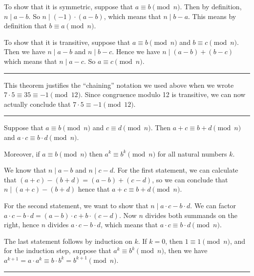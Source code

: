 \documentclass[letterpaper,10pt,english]{sphinxmanual}
\begin{document}
\sphinxAtStartPar
To show that it is symmetric, suppose that \(a \equiv b \pmod{n}\). Then by definition, \(n \mid a - b\). So \(n \mid (-1) \cdot (a - b)\), which means that \(n \mid b - a\). This means by definition that \(b \equiv a \pmod{n}\).

\sphinxAtStartPar
To show that it is transitive, suppose that \(a \equiv b \pmod{n}\) and \(b \equiv c \pmod{n}\). Then we have \(n \mid a - b\) and \(n \mid b - c\). Hence we have \(n \mid (a - b) + (b - c)\) which means that \(n \mid a - c\). So \(a \equiv c \pmod{n}\).


\bigskip\hrule\bigskip


\sphinxAtStartPar
This theorem justifies the “chaining” notation we used above when we wrote \(7 \cdot 5 \equiv 35 \equiv -1 \pmod{12}\). Since congruence modulo 12 is transitive, we can now actually conclude that \(7\cdot 5\equiv -1 \pmod{12}\).


\bigskip\hrule\bigskip


\sphinxAtStartPar
{} Suppose that \(a\equiv b \pmod{n}\) and \(c\equiv d\pmod{n}\). Then \(a+c\equiv b+d \pmod{n}\) and \(a\cdot c\equiv b\cdot d\pmod{n}\).

\sphinxAtStartPar
Moreover, if \(a\equiv b \pmod{n}\) then \(a^k\equiv b^k \pmod{n}\) for all natural numbers \(k\).

\sphinxAtStartPar
{} We know that \(n \mid a - b\) and \(n \mid c - d\). For the first statement, we can calculate that \((a + c) - (b + d) = (a - b) + (c - d)\), so we can conclude that \(n \mid (a + c) - (b + d)\) hence that \(a+c\equiv b+d\pmod{n}\).

\sphinxAtStartPar
For the second statement, we want to show that \(n \mid a\cdot c - b\cdot d\). We can factor \(a\cdot c - b\cdot d = (a - b)\cdot c + b\cdot(c-d)\). Now \(n\) divides both summands on the right, hence \(n\) divides \(a\cdot c - b\cdot d\), which means that \(a\cdot c\equiv b\cdot d\pmod{n}\).

\sphinxAtStartPar
The last statement follows by induction on \(k\). If \(k = 0\), then \(1\equiv 1 \pmod{n}\), and for the induction step, suppose that \(a^k\equiv b^k\pmod{n}\), then we have \(a^{k+1}= a\cdot a^k \equiv b \cdot b^k = b^{k+1} \pmod{n}\).


\bigskip\hrule\bigskip
\end{document}
